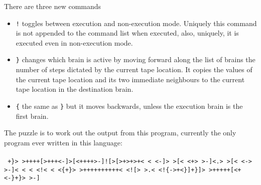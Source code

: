 \documentclass[12pt]{article}
\begin{document}
There are three new commands
\begin{itemize}
\item \texttt{!} toggles between execution and non-execution mode. Uniquely
  this command is not appended to the command list when executed,
  also, uniquely, it is executed even in non-execution mode.
\item \texttt{\}} changes which brain is active by moving forward along the list of brains the number of steps dictated by the current tape location. It copies the values of the current tape location and its two immediate neighbours to the current tape location in the destination brain. 
\item \texttt{\{} the same as \texttt{\}} but it moves backwards, unless the execution brain is the first brain.
\end{itemize}

The puzzle is to work out the output from this program, currently the only program ever written in this language:\\
\\
\texttt{
+\}> >++++[>+++<-]>[<++++>-]![>[>+>+>+< < <-]> >[< <+> >-]<.> >[< <-> >-]< < < <!< < <\{+\}> >++++++++++< <![> >.< <!\{->+<\}]+\}]> >+++++[<+<-\}+\}>  >-]
}
 
\end{document}
